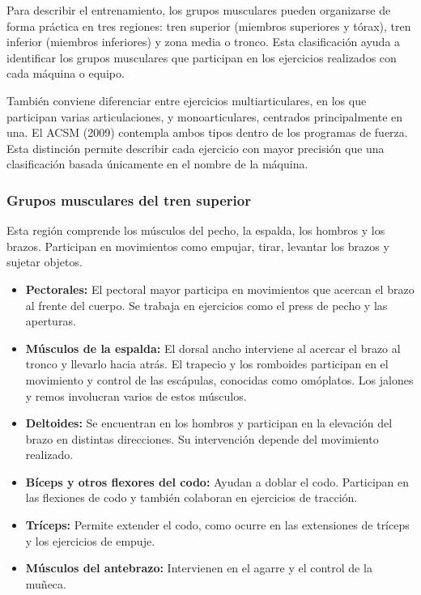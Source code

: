 Para describir el entrenamiento, los grupos musculares pueden organizarse
de forma práctica en tres regiones: tren superior (miembros superiores y tórax), tren inferior (miembros inferiores) y
zona media o tronco. Esta clasificación ayuda a identificar los grupos musculares que participan
en los ejercicios realizados con cada máquina o equipo.

También conviene diferenciar entre ejercicios multiarticulares, en los que
participan varias articulaciones, y monoarticulares, centrados principalmente
en una. El ACSM (2009) contempla ambos tipos dentro de los programas de fuerza.
Esta distinción permite describir cada ejercicio con mayor precisión que una
clasificación basada únicamente en el nombre de la máquina.

\subsubsection{Grupos musculares del tren superior}

Esta región comprende los músculos del pecho, la
espalda, los hombros y los brazos. Participan en movimientos como empujar,
tirar, levantar los brazos y sujetar objetos.

\begin{itemize}
    \item \textbf{Pectorales:}
    El pectoral mayor participa en movimientos que acercan el brazo al frente
    del cuerpo. Se trabaja en ejercicios como el press de pecho y las
    aperturas.

    \item \textbf{Músculos de la espalda:}
    El dorsal ancho interviene al acercar el brazo al tronco y llevarlo hacia
    atrás. El trapecio y los romboides participan en el movimiento y control de
    las escápulas, conocidas como omóplatos. Los jalones y remos involucran
    varios de estos músculos.

    \item \textbf{Deltoides:}
    Se encuentran en los hombros y participan en la elevación del brazo en
    distintas direcciones. Su intervención depende del movimiento realizado.

    \item \textbf{Bíceps y otros flexores del codo:}
    Ayudan a doblar el codo. Participan en las flexiones de codo y también colaboran en
    ejercicios de tracción.

    \item \textbf{Tríceps:}
    Permite extender el codo, como ocurre en las extensiones de tríceps y los
    ejercicios de empuje.

    \item \textbf{Músculos del antebrazo:}
    Intervienen en el agarre y el control de la muñeca.
\end{itemize}

